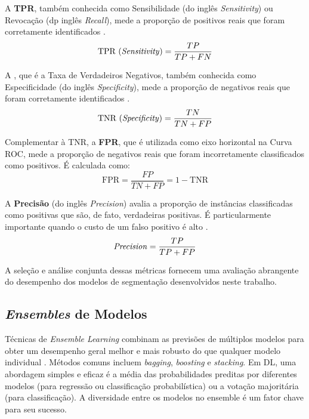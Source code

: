 A \textbf{TPR}, também conhecida como Sensibilidade (do inglês \textit{Sensitivity}) ou Revocação (dp inglês \textit{Recall}), mede a proporção de positivos reais que foram corretamente identificados \cite{Altman1994, Fletcher2014}.
\begin{equation}\label{eq:tpr}
    \text{TPR (\textit{Sensitivity})} = \frac{TP}{TP + FN}
\end{equation}

A \textbf{}, que é a Taxa de Verdadeiros Negativos, também conhecida como Especificidade (do inglês \textit{Specificity}), mede a proporção de negativos reais que foram corretamente identificados \cite{Altman1994, Fletcher2014}.
\begin{equation}\label{eq:tnr}
    \text{TNR (\textit{Specificity})} = \frac{TN}{TN + FP}
\end{equation}

Complementar à TNR, a \textbf{FPR}, que é utilizada como eixo horizontal na Curva ROC, mede a proporção de negativos reais que foram incorretamente classificados como positivos. É calculada como:
\begin{equation}\label{eq:fpr}
    \text{FPR} = \frac{FP}{TN + FP} = 1 - \text{TNR}
\end{equation}

A \textbf{Precisão} (do inglês \textit{Precision}) avalia a proporção de instâncias classificadas como positivas que são, de fato, verdadeiras positivas. É particularmente importante quando o custo de um falso positivo é alto \cite{Powers2011, Hastie2009}.
\begin{equation}\label{eq:precisao}
    \text{\textit{Precision}} = \frac{TP}{TP + FP}
\end{equation}

A seleção e análise conjunta dessas métricas fornecem uma avaliação abrangente do desempenho dos modelos de segmentação desenvolvidos neste trabalho.

\subsection{\textit{Ensembles} de Modelos}\label{subsec:ensembles}
Técnicas de \textit{Ensemble Learning} combinam as previsões de múltiplos modelos para obter um desempenho geral melhor e mais robusto do que qualquer modelo individual \cite{Dietterich2000}. Métodos comuns incluem \textit{bagging}, \textit{boosting} e \textit{stacking}. Em DL, uma abordagem simples e eficaz é a média das probabilidades preditas por diferentes modelos (para regressão ou classificação probabilística) ou a votação majoritária (para classificação). A diversidade entre os modelos no ensemble é um fator chave para seu sucesso.

